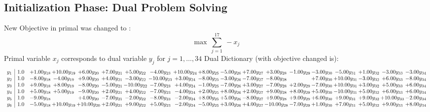 \documentclass[9pt]{article}
\begin{document}
\subsection{Initialization Phase: Dual Problem Solving}
New Objective in primal was changed to : \[ \max\ \sum_{j=1}^{17}\ - x_j \] 
Primal variable $x_j$ corresponds to dual variable $y_j$ for $j = 1,\ldots,34$
Dual Dictionary (with objective changed is): 
\[\begin{array}{c| c c@{\hskip 2pt} c@{\hskip 2pt} c@{\hskip 2pt} c@{\hskip 2pt} c@{\hskip 2pt} c@{\hskip 2pt} c@{\hskip 2pt} c@{\hskip 2pt} c@{\hskip 2pt} c@{\hskip 2pt} c@{\hskip 2pt} c@{\hskip 2pt} c@{\hskip 2pt} c@{\hskip 2pt} c@{\hskip 2pt} c@{\hskip 2pt} c@{\hskip 2pt} }
 y_{1}   &  1.0 & +  1.00 y_{18} & + 10.00 y_{19} & +  6.00 y_{20} & +  7.00 y_{21} & +  5.00 y_{22} & -4.00 y_{23} & + 10.00 y_{24} & +  8.00 y_{25} & -5.00 y_{26} & +  7.00 y_{27} & +  3.00 y_{28} & -1.00 y_{29} & -3.00 y_{30} & -5.00 y_{31} & +  1.00 y_{32} & -3.00 y_{33} & -3.00 y_{34}\\
 y_{2}   &  1.0 & -8.00 y_{18} & -4.00 y_{19} & +  9.00 y_{20} & +  4.00 y_{21} & -3.00 y_{22} & -10.00 y_{23} & +  3.00 y_{24} & -8.00 y_{25} & -3.00 y_{26} & -7.00 y_{27} & -8.00 y_{28} &   & +  7.00 y_{30} & + 10.00 y_{31} & -3.00 y_{32} & +  6.00 y_{33} & -8.00 y_{34}\\
 y_{3}   &  1.0 & +  9.00 y_{18} & +  8.00 y_{19} & -8.00 y_{20} & -5.00 y_{21} & -10.00 y_{22} & -7.00 y_{23} & +  4.00 y_{24} & -1.00 y_{25} & -7.00 y_{26} & +  3.00 y_{27} & -7.00 y_{28} & +  2.00 y_{29} & -7.00 y_{30} & + 10.00 y_{31} & +  3.00 y_{32} & +  5.00 y_{33} & +  6.00 y_{34}\\
 y_{4}   &  1.0 & +  5.00 y_{18} & +  5.00 y_{19} & -9.00 y_{20} & +  2.00 y_{21} & +  4.00 y_{22} & -7.00 y_{23} & -4.00 y_{24} & +  2.00 y_{25} & +  8.00 y_{26} & +  2.00 y_{27} & +  9.00 y_{28} & +  8.00 y_{29} & +  5.00 y_{30} & -10.00 y_{31} & +  5.00 y_{32} & +  6.00 y_{33} & +  6.00 y_{34}\\
 y_{5}   &  1.0 & -9.00 y_{18} &   & +  4.00 y_{20} & -7.00 y_{21} & -2.00 y_{22} & -8.00 y_{23} & -2.00 y_{24} & +  8.00 y_{25} & +  5.00 y_{26} & -8.00 y_{27} & +  9.00 y_{28} & +  9.00 y_{29} & +  6.00 y_{30} & +  9.00 y_{31} & +  9.00 y_{32} & + 10.00 y_{33} & -2.00 y_{34}\\
 y_{6}   &  1.0 & -5.00 y_{18} & + 10.00 y_{19} & + 10.00 y_{20} & +  2.00 y_{21} & +  9.00 y_{22} & +  5.00 y_{23} & -2.00 y_{24} & -5.00 y_{25} & +  3.00 y_{26} & +  4.00 y_{27} & -10.00 y_{28} & -7.00 y_{29} & +  1.00 y_{30} & +  7.00 y_{31} & +  5.00 y_{32} & +  9.00 y_{33} & +  8.00 y_{34}\\

\end{array}\]
\end{document}
